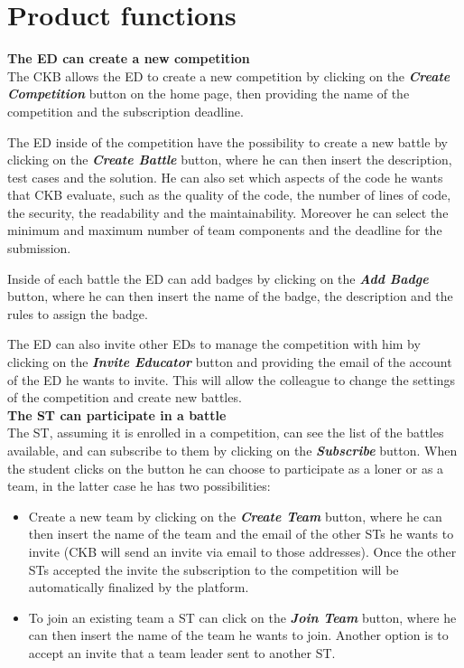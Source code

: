 \section{Product functions}
\label{s:Product_functions}%

\textbf{The ED can create a new competition} \\
The CKB allows the ED to create a new competition by clicking on the \textbf{\textit{Create Competition}} button on the home page, then providing the name of the competition and the subscription deadline.

The ED inside of the competition have the possibility to create a new battle by clicking on the \textbf{\textit{Create Battle}} button, where he can then insert the description, test cases and the solution. He can also set which aspects of the code he wants that CKB evaluate, such as the quality of the code, the number of lines of code, the security, the readability and the maintainability. Moreover he can select the minimum and maximum number of team components and the deadline for the submission.

Inside of each battle the ED can add badges by clicking on the \textbf{\textit{Add Badge}} button, where he can then insert the name of the badge, the description and the rules to assign the badge.

The ED can also invite other EDs to manage the competition with him by clicking on the \textbf{\textit{Invite Educator}} button and providing the email of the account of the ED he wants to invite. This will allow the colleague to change the settings of the competition and create new battles. \\

\textbf{The ST can participate in a battle} \\
The ST, assuming it is enrolled in a competition, can see the list of the battles available, and can subscribe to them by clicking on the \textbf{\textit{Subscribe}} button. When the student clicks on the button he can choose to participate as a loner or as a team, in the latter case he has two possibilities: 
\begin{itemize}
  \item Create a new team by clicking on the \textbf{\textit{Create Team}} button, where he can then insert the name of the team and the email of the other STs he wants to invite (CKB will send an invite via email to those addresses). Once the other STs accepted the invite the subscription to the competition will be automatically finalized by the platform.
  \item To join an existing team a ST can click on the \textbf{\textit{Join Team}} button, where he can then insert the name of the team he wants to join. Another option is to accept an invite that a team leader sent to another ST.
\end{itemize}

